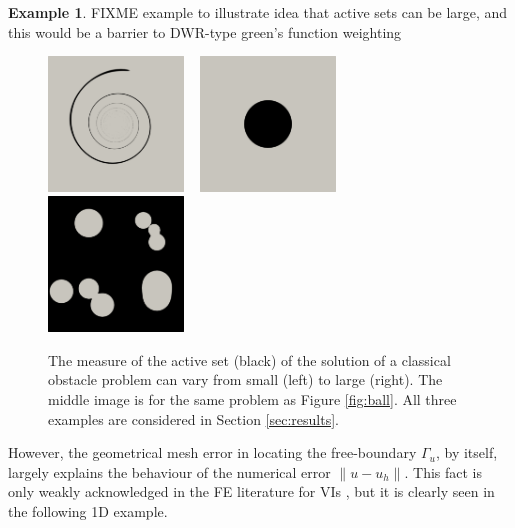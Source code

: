 \documentclass[]{interact}
\theoremstyle{plain}%
\theoremstyle{definition}
\newtheorem{example}[theorem]{Example}
\theoremstyle{remark}
\begin{document}
\begin{example} FIXME example to illustrate idea that active sets can be large, and this would be a barrier to DWR-type green's function weighting

\begin{figure}[H]
\noindent \hspace{-1mm} \mbox{\includegraphics[width=0.32\textwidth]{static/spiral.png} \,
\includegraphics[width=0.32\textwidth]{static/sphere.png} \,
\includegraphics[width=0.32\textwidth]{static/blisters.png}}
\caption{The measure of the active set (black) of the solution of a classical obstacle problem can vary from small (left) to large (right).  The middle image is for the same problem as Figure \ref{fig:ball}.  All three examples are considered in Section \ref{sec:results}.}
\label{fig:activesizes}
\end{figure}

\end{example}

However, the geometrical mesh error in locating the free-boundary $\Gamma_u$, by itself, largely explains the behaviour of the numerical error $\|u-u_h\|$.  This fact is only weakly acknowledged in the FE literature for VIs \cite[for example]{Suttmeier2008}, but it is clearly seen in the following 1D example.
\end{document}

